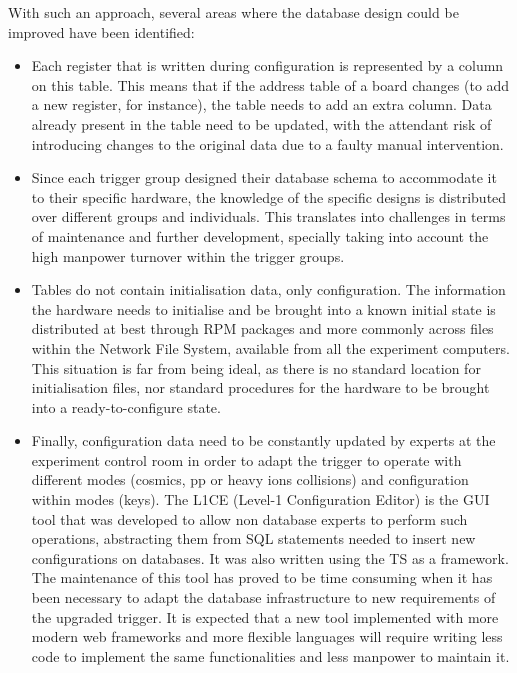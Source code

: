 \documentclass[a4paper]{jpconf}
\begin{document}
With such an approach, several areas where the database design could be improved have been identified:
\begin{itemize}
  \item Each register that is written during configuration is represented by a column on this table. This means that if the address table of a board changes (to add a new register, for instance), the table needs to add an extra column. Data already present in the table need to be updated, with the attendant risk of introducing changes to the original data due to a faulty manual intervention. 
  \item Since each trigger group designed their database schema to accommodate it to their specific hardware, the knowledge of the specific designs is distributed over different groups and individuals. This translates into challenges in terms of maintenance and further development, specially taking into account the high manpower turnover within the trigger groups. 
  \item Tables do not contain initialisation data, only configuration. The information the hardware needs to initialise and be brought into a known initial state is distributed at best through RPM packages and more commonly across files within the Network File System, available from all the experiment computers. This situation is far from being ideal, as there is no standard location for initialisation files, nor standard procedures for the hardware to be brought into a ready-to-configure state. 
  \item Finally, configuration data need to be constantly updated by experts at the experiment control room in order to adapt the trigger to operate with different modes (cosmics, pp or heavy ions collisions) and configuration within modes (keys). The L1CE (Level-1 Configuration Editor) is the GUI tool that was developed to allow non database experts to perform such operations, abstracting them from SQL statements needed to insert new configurations on databases. It was also written using the TS as a framework. The maintenance of this tool has proved to be time consuming when it has been necessary to adapt the database infrastructure to new requirements of the upgraded trigger. It is expected that a new tool implemented with more modern web frameworks and more flexible languages will require writing less code to implement the same functionalities and less manpower to maintain it. 

\end{itemize}
   
\end{document}
